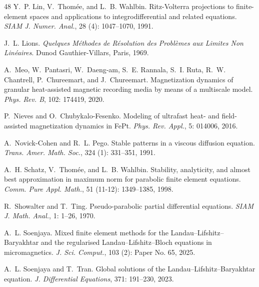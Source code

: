 \documentclass[11pt,reqno]{amsart}
\theoremstyle{definition}
\numberwithin{equation}{section}
\begin{document}
\begin{thebibliography}{48}
	Y.~P. Lin, V.~Thom\'{e}e, and L.~B. Wahlbin.
	\newblock Ritz-{V}olterra projections to finite-element spaces and applications
	to integrodifferential and related equations.
	\newblock \emph{SIAM J. Numer. Anal.}, 28 (4): 1047--1070,
	1991.
	
	J.~L. Lions.
	\newblock \emph{Quelques M\'ethodes de R\'esolution des Probl\`emes aux Limites
		Non Lin\'eaires}.
	\newblock Dunod Gauthier-Villars, Paris, 1969.
	
	A.~Meo, W.~Pantasri, W.~Daeng-am, S.~E. Rannala, S.~I. Ruta, R.~W. Chantrell,
	P.~Chureemart, and J.~Chureemart.
	\newblock Magnetization dynamics of granular heat-assisted magnetic recording
	media by means of a multiscale model.
	\newblock \emph{Phys. Rev. B}, 102: 174419, 2020.
	
	P.~Nieves and O.~Chubykalo-Fesenko.
	\newblock Modeling of ultrafast heat- and field-assisted magnetization dynamics
	in {F}e{P}t.
	\newblock \emph{Phys. Rev. Appl.}, 5: 014006, 2016.
	
	A.~Novick-Cohen and R.~L. Pego.
	\newblock Stable patterns in a viscous diffusion equation.
	\newblock \emph{Trans. Amer. Math. Soc.}, 324 (1): 331--351,
	1991.
	
	A.~H. Schatz, V.~Thom\'ee, and L.~B. Wahlbin.
	\newblock Stability, analyticity, and almost best approximation in maximum norm
	for parabolic finite element equations.
	\newblock \emph{Comm. Pure Appl. Math.}, 51 (11-12):
	1349--1385, 1998.
	
	R.~Showalter and T.~Ting.
	\newblock Pseudo-parabolic partial differential equations.
	\newblock \emph{SIAM J. Math. Anal.}, 1: 1--26, 1970.
	
	A.~L. Soenjaya.
	\newblock Mixed finite element methods for the
	{L}andau--{L}ifshitz--{B}aryakhtar and the regularised
	{L}andau--{L}ifshitz--{B}loch equations in micromagnetics.
	\newblock \emph{J. Sci. Comput.}, 103 (2): Paper No. 65,
	2025.
	
	A.~L. Soenjaya and T.~Tran.
	\newblock Global solutions of the {L}andau--{L}ifshitz--{B}aryakhtar equation.
	\newblock \emph{J. Differential Equations}, 371: 191--230, 2023.
	

\end{thebibliography}
\end{document}
